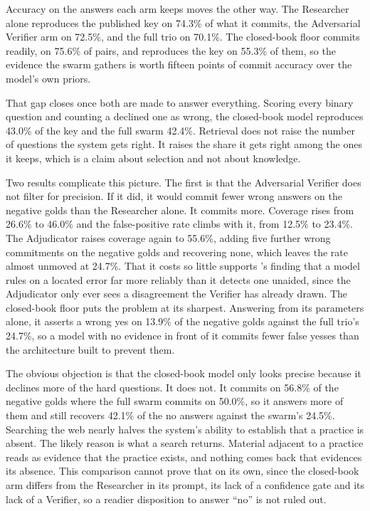 Accuracy on the answers each arm keeps moves the other way. The Researcher alone reproduces the published key on 74.3\% of what it commits, the Adversarial Verifier arm on 72.5\%, and the full trio on 70.1\%. The closed-book floor commits readily, on 75.6\% of pairs, and reproduces the key on 55.3\% of them, so the evidence the swarm gathers is worth fifteen points of commit accuracy over the model's own priors.

That gap closes once both are made to answer everything. Scoring every binary question and counting a declined one as wrong, the closed-book model reproduces 43.0\% of the key and the full swarm 42.4\%. Retrieval does not raise the number of questions the system gets right. It raises the share it gets right among the ones it keeps, which is a claim about selection and not about knowledge.

Two results complicate this picture. The first is that the Adversarial Verifier does not filter for precision. If it did, it would commit fewer wrong answers on the negative golds than the Researcher alone. It commits more. Coverage rises from 26.6\% to 46.0\% and the false-positive rate climbs with it, from 12.5\% to 23.4\%. The Adjudicator raises coverage again to 55.6\%, adding five further wrong commitments on the negative golds and recovering none, which leaves the rate almost unmoved at 24.7\%. That it costs so little supports \citeauthor{tyen2024}'s finding \citep{tyen2024} that a model rules on a located error far more reliably than it detects one unaided, since the Adjudicator only ever sees a disagreement the Verifier has already drawn. The closed-book floor puts the problem at its sharpest. Answering from its parameters alone, it asserts a wrong yes on 13.9\% of the negative golds against the full trio's 24.7\%, so a model with no evidence in front of it commits fewer false yesses than the architecture built to prevent them.

The obvious objection is that the closed-book model only looks precise because it declines more of the hard questions. It does not. It commits on 56.8\% of the negative golds where the full swarm commits on 50.0\%, so it answers more of them and still recovers 42.1\% of the no answers against the swarm's 24.5\%. Searching the web nearly halves the system's ability to establish that a practice is absent. The likely reason is what a search returns. Material adjacent to a practice reads as evidence that the practice exists, and nothing comes back that evidences its absence. This comparison cannot prove that on its own, since the closed-book arm differs from the Researcher in its prompt, its lack of a confidence gate and its lack of a Verifier, so a readier disposition to answer ``no'' is not ruled out.

